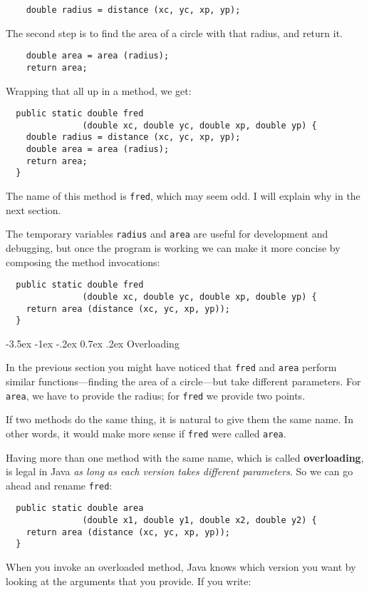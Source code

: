 \documentclass{book}
\makeatletter
\renewcommand{\section}{\@startsection 
    {section} {1} {0mm}%
    {-3.5ex \@plus -1ex \@minus -.2ex}%
    {0.7ex \@plus.2ex}%
    {\normalfont\Large\bfseries}}
\makeatother
\begin{document}
\begin{verbatim}
    double radius = distance (xc, yc, xp, yp);
\end{verbatim}
%
The second step is to find the area of a circle with that
radius, and return it.

\begin{verbatim}
    double area = area (radius);
    return area;
\end{verbatim}
%
Wrapping that all up in a method, we get:

\begin{verbatim}
  public static double fred
               (double xc, double yc, double xp, double yp) {
    double radius = distance (xc, yc, xp, yp);
    double area = area (radius);
    return area;
  } 
\end{verbatim}
%
The name of this method is {\tt fred}, which may seem odd.  I will
explain why in the next section.

The temporary variables {\tt radius} and {\tt area} are
useful for development and debugging, but once the program is
working we can make it more concise by composing
the method invocations:

\begin{verbatim}
  public static double fred
               (double xc, double yc, double xp, double yp) {
    return area (distance (xc, yc, xp, yp));
  } 
\end{verbatim}

\section{Overloading}
\label{overloading}

In the previous section you might have noticed that {\tt fred}
and {\tt area} perform similar functions---finding
the area of a circle---but take different parameters.  For
{\tt area}, we have to provide the radius; for {\tt fred}
we provide two points.

If two methods do the same thing, it is natural to give them
the same name.  In other words, it would make more sense if
{\tt fred} were called {\tt area}.

Having more than one method with the same name, which is called {\bf
overloading}, is legal in Java {\em as long as each version takes
different parameters}.  So we can go ahead and rename {\tt fred}:

\begin{verbatim}
  public static double area
               (double x1, double y1, double x2, double y2) {
    return area (distance (xc, yc, xp, yp));
  } 
\end{verbatim}
%
When you invoke an overloaded method, Java knows which version you
want by looking at the arguments that you provide.  If you write:
\end{document}
